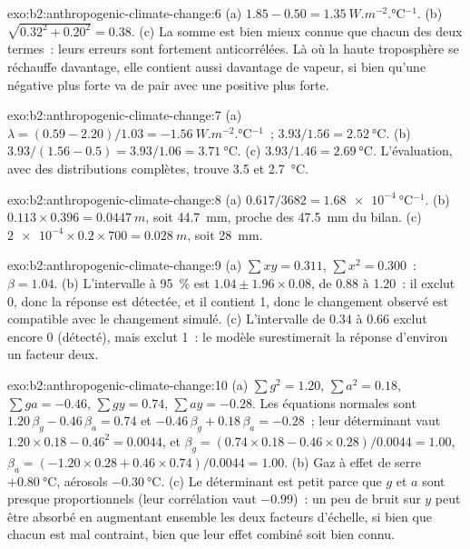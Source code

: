 \begin{solution}{exo:b2:anthropogenic-climate-change:6}
(a) $1.85 - 0.50 = \qty{1.35}{W.m^{-2}.\celsius^{-1}}$. (b) $\sqrt{0.32^2 + 0.20^2} = 0.38$. (c) La somme est
bien mieux connue que chacun des deux termes~: leurs erreurs sont fortement anticorrélées. Là où la haute
troposphère se réchauffe davantage, elle contient aussi davantage de vapeur, si bien qu'une  négative plus forte va de pair avec une  positive plus forte.
\end{solution}

\begin{solution}{exo:b2:anthropogenic-climate-change:7}
(a) $\lambda = (0.59 - 2.20)/1.03 = \qty{-1.56}{W.m^{-2}.\celsius^{-1}}$~; $3.93/1.56 =
\qty{2.52}{\celsius}$. (b) $3.93/(1.56 - 0.5) = 3.93/1.06 = \qty{3.71}{\celsius}$. (c) $3.93/1.46 =
\qty{2.69}{\celsius}$. L'évaluation, avec des distributions complètes, trouve 3.5 et \qty{2.7}{\celsius}.
\end{solution}

\begin{solution}{exo:b2:anthropogenic-climate-change:8}
(a) $0.617/3682 = \qty{1.68e-4}{\celsius^{-1}}$. (b) $0.113 \times 0.396 = \qty{0.0447}{m}$,
soit \qty{44.7}{mm}, proche des \qty{47.5}{mm} du bilan. (c) $\num{2e-4} \times 0.2 \times 700 =
\qty{0.028}{m}$, soit \qty{28}{mm}.
\end{solution}

\begin{solution}{exo:b2:anthropogenic-climate-change:9}
(a) $\sum xy = 0.311$, $\sum x^2 = 0.300$~: $\beta = 1.04$. (b) L'intervalle à
\qty{95}{\percent} est $1.04 \pm 1.96 \times 0.08$, de 0.88 à 1.20~: il exclut 0, donc
la réponse est détectée, et il contient 1, donc le changement observé est compatible
avec le changement simulé. (c) L'intervalle de 0.34 à 0.66 exclut encore 0 (détecté),
mais exclut 1~: le modèle surestimerait la réponse d'environ un facteur deux.
\end{solution}

\begin{solution}{exo:b2:anthropogenic-climate-change:10}
(a) $\sum g^2 = 1.20$, $\sum a^2 = 0.18$, $\sum ga = -0.46$, $\sum gy = 0.74$, $\sum ay = -0.28$. Les
équations normales sont $1.20\,\beta_g - 0.46\,\beta_a = 0.74$ et $-0.46\,\beta_g + 0.18\,\beta_a
= -0.28$~; leur déterminant vaut $1.20 \times 0.18 - 0.46^2 = 0.0044$, et $\beta_g = (0.74 \times
0.18 - 0.46 \times 0.28)/0.0044 = 1.00$, $\beta_a = (-1.20 \times 0.28 + 0.46 \times 0.74)/0.0044 =
1.00$. (b) Gaz à effet de serre $+\qty{0.80}{\celsius}$, aérosols $-\qty{0.30}{\celsius}$. (c) Le
déterminant est petit parce que $g$ et $a$ sont presque proportionnels (leur corrélation vaut
$-0.99$)~: un peu de bruit sur $y$ peut être absorbé en augmentant ensemble les deux facteurs
d'échelle, si bien que chacun est mal contraint, bien que leur effet combiné soit bien connu.
\end{solution}

